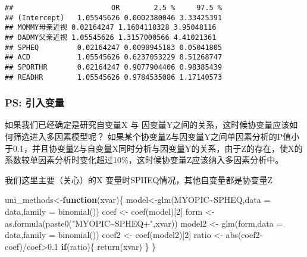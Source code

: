 \documentclass[]{ctexbook}
\newenvironment{Shaded}{\begin{snugshade}}{\end{snugshade}}
\newcommand{\AttributeTok}[1]{\textcolor[rgb]{0.77,0.63,0.00}{#1}}
\newcommand{\ControlFlowTok}[1]{\textcolor[rgb]{0.13,0.29,0.53}{\textbf{#1}}}
\newcommand{\DecValTok}[1]{\textcolor[rgb]{0.00,0.00,0.81}{#1}}
\newcommand{\FloatTok}[1]{\textcolor[rgb]{0.00,0.00,0.81}{#1}}
\newcommand{\FunctionTok}[1]{\textcolor[rgb]{0.00,0.00,0.00}{#1}}
\newcommand{\NormalTok}[1]{#1}
\newcommand{\OtherTok}[1]{\textcolor[rgb]{0.56,0.35,0.01}{#1}}
\newcommand{\SpecialCharTok}[1]{\textcolor[rgb]{0.00,0.00,0.00}{#1}}
\newcommand{\StringTok}[1]{\textcolor[rgb]{0.31,0.60,0.02}{#1}}
\begin{document}
\begin{verbatim}
##                       OR        2.5 %     97.5 %
## (Intercept)   1.05545626 0.0002380046 3.33425391
## MOMMY母亲近视 0.02164247 1.1604118328 3.95048116
## DADMY父亲近视 1.05545626 1.3157000566 4.41021361
## SPHEQ         0.02164247 0.0090945183 0.05041805
## ACD           1.05545626 0.6237053229 8.51268747
## SPORTHR       0.02164247 0.9077904406 0.98385439
## READHR        1.05545626 0.9784535086 1.17140573
\end{verbatim}

\hypertarget{ps-ux5f15ux5165ux53d8ux91cf}{%
\subsubsection{PS: 引入变量}\label{ps-ux5f15ux5165ux53d8ux91cf}}

如果我们已经确定是研究自变量X 与 因变量Y之间的关系，这时候协变量应该如何筛选进入多因素模型呢？
如果某个协变量Z与因变量Y之间单因素分析的P值小于0.1，并且协变量Z与自变量X同时分析与因变量Y的关系，由于Z的存在，使X的系数较单因素分析时变化超过10\%，这时候协变量Z应该纳入多因素分析中。

我们这里主要（关心）的X 变量时SPHEQ情况，其他自变量都是协变量Z

\begin{Shaded}
\begin{Highlighting}[]
\NormalTok{uni\_methods}\OtherTok{\textless{}{-}}\ControlFlowTok{function}\NormalTok{(xvar)\{}
\NormalTok{  model}\OtherTok{\textless{}{-}}\FunctionTok{glm}\NormalTok{(MYOPIC}\SpecialCharTok{\textasciitilde{}}\NormalTok{SPHEQ,}\AttributeTok{data =}\NormalTok{ data,}\AttributeTok{family =} \FunctionTok{binomial}\NormalTok{())}
\NormalTok{  coef }\OtherTok{\textless{}{-}} \FunctionTok{coef}\NormalTok{(model)[}\DecValTok{2}\NormalTok{]}
\NormalTok{  form }\OtherTok{\textless{}{-}} \FunctionTok{as.formula}\NormalTok{(}\FunctionTok{paste0}\NormalTok{(}\StringTok{"MYOPIC\textasciitilde{}SPHEQ+"}\NormalTok{,xvar))}
\NormalTok{  model2 }\OtherTok{\textless{}{-}} \FunctionTok{glm}\NormalTok{(form,}\AttributeTok{data =}\NormalTok{ data,}\AttributeTok{family =} \FunctionTok{binomial}\NormalTok{())}
\NormalTok{  coef2 }\OtherTok{\textless{}{-}} \FunctionTok{coef}\NormalTok{(model2)[}\DecValTok{2}\NormalTok{]}
\NormalTok{  ratio }\OtherTok{\textless{}{-}} \FunctionTok{abs}\NormalTok{(coef2}\SpecialCharTok{{-}}\NormalTok{coef)}\SpecialCharTok{/}\NormalTok{coef}\SpecialCharTok{\textgreater{}}\FloatTok{0.1}
  \ControlFlowTok{if}\NormalTok{(ratio)\{}
    \FunctionTok{return}\NormalTok{(xvar)}
\NormalTok{  \}}
\NormalTok{\}}
\end{Highlighting}
\end{Shaded}
\end{document}
